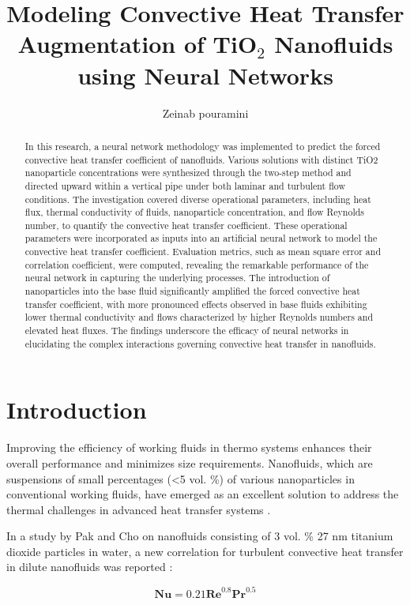 \documentclass{article}
\title{Modeling Convective Heat Transfer Augmentation of TiO$_2$ Nanofluids using Neural Networks}
\author{Zeinab pouramini}
\date{}
\begin{document}
\maketitle

\begin{abstract}
In this research, a neural network methodology was implemented to predict the forced convective heat transfer coefficient of nanofluids. Various solutions with distinct TiO2 nanoparticle concentrations were synthesized through the two-step method and directed upward within a vertical pipe under both laminar and turbulent flow conditions. The investigation covered diverse operational parameters, including heat flux, thermal conductivity of fluids, nanoparticle concentration, and flow Reynolds number, to quantify the convective heat transfer coefficient. These operational parameters were incorporated as inputs into an artificial neural network to model the convective heat transfer coefficient. Evaluation metrics, such as mean square error and correlation coefficient, were computed, revealing the remarkable performance of the neural network in capturing the underlying processes. The introduction of nanoparticles into the base fluid significantly amplified the forced convective heat transfer coefficient, with more pronounced effects observed in base fluids exhibiting lower thermal conductivity and flows characterized by higher Reynolds numbers and elevated heat fluxes. The findings underscore the efficacy of neural networks in elucidating the complex interactions governing convective heat transfer in nanofluids.
\end{abstract}


\section{Introduction}
Improving the efficiency of working fluids in thermo systems enhances their overall performance and minimizes size requirements. Nanofluids, which are suspensions of small percentages (<5 vol.  \%) of various nanoparticles in conventional working fluids, have emerged as an excellent solution to address the thermal challenges in advanced heat transfer systems \cite{chen2023}.

In a study by Pak and Cho on nanofluids consisting of 3 vol.  \% 27 nm titanium dioxide particles in water, a new correlation for turbulent convective heat transfer in dilute nanofluids was reported \cite{ref1}:

\begin{equation}
 \mathbf{Nu} = 0.21 \mathbf{Re}^{0.8} \mathbf{Pr}^{0.5}
\end{equation}
\end{document}
